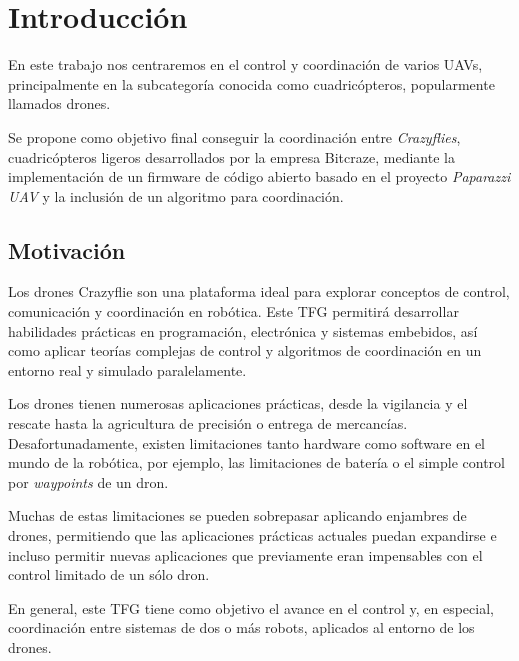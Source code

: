 \chapter{Introducción}

En este trabajo nos centraremos en el control y coordinación de varios UAVs, principalmente en la subcategoría conocida como cuadricópteros, popularmente llamados drones. 

Se propone como objetivo final conseguir la coordinación entre \textit{Crazyflies}, cuadricópteros ligeros desarrollados por la empresa Bitcraze,
mediante la implementación de un firmware de código abierto basado en el proyecto \textit{Paparazzi UAV} 
\cite{paparazzi_github} y la inclusión de un algoritmo para coordinación.


\section{Motivación}

Los drones Crazyflie son una plataforma ideal para explorar conceptos de control, comunicación y coordinación en robótica. 
Este TFG permitirá desarrollar habilidades prácticas en programación, electrónica y sistemas embebidos, 
así como aplicar teorías complejas de control y algoritmos de coordinación en un entorno real y simulado paralelamente.

Los drones tienen numerosas aplicaciones prácticas, desde la vigilancia y el rescate hasta la agricultura de precisión o entrega de mercancías. 
Desafortunadamente, existen limitaciones tanto hardware como software en el mundo de la robótica, por ejemplo,
las limitaciones de batería o el simple control por \textit{waypoints} de un dron.

Muchas de estas limitaciones se pueden sobrepasar aplicando enjambres de drones, permitiendo que las aplicaciones
prácticas actuales puedan expandirse e incluso permitir nuevas aplicaciones que previamente
eran impensables con el control limitado de un sólo dron.

En general, este TFG tiene como objetivo el avance en el control y, en especial, coordinación entre sistemas
de dos o más robots, aplicados al entorno de los drones.

